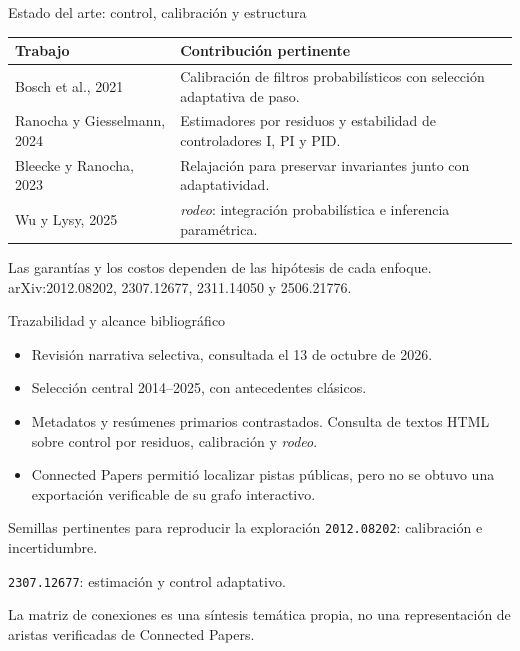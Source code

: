\documentclass[aspectratio=169,11pt]{beamer}
\newcommand{\source}[1]{\vfill{\tiny\color{graytext}#1}}
\begin{document}
\begin{frame}{Estado del arte: control, calibración y estructura}
\small\renewcommand{\arraystretch}{1.35}
\begin{tabularx}{0.98\linewidth}{@{}p{3.7cm}X@{}}\toprule
Trabajo & Contribución pertinente\\\midrule
Bosch et al., 2021 & Calibración de filtros probabilísticos con selección adaptativa de paso.\\
Ranocha y Giesselmann, 2024 & Estimadores por residuos y estabilidad de controladores I, PI y PID.\\
Bleecke y Ranocha, 2023 & Relajación para preservar invariantes junto con adaptatividad.\\
Wu y Lysy, 2025 & \emph{rodeo}: integración probabilística e inferencia paramétrica.\\\bottomrule
\end{tabularx}\par
\vspace{0.3cm}
\small Las garantías y los costos dependen de las hipótesis de cada enfoque.
\source{arXiv:2012.08202, 2307.12677, 2311.14050 y 2506.21776.}
\end{frame}

\begin{frame}{Trazabilidad y alcance bibliográfico}
\begin{itemize}
\item Revisión narrativa selectiva, consultada el 13 de octubre de 2026.
\item Selección central 2014--2025, con antecedentes clásicos.
\item Metadatos y resúmenes primarios contrastados. Consulta de textos HTML sobre control por residuos, calibración y \emph{rodeo}.
\item Connected Papers permitió localizar pistas públicas, pero no se obtuvo una exportación verificable de su grafo interactivo.
\end{itemize}
\begin{block}{Semillas pertinentes para reproducir la exploración}
\texttt{2012.08202}: calibración e incertidumbre.\par
\texttt{2307.12677}: estimación y control adaptativo.
\end{block}
\small La matriz de conexiones es una síntesis temática propia, no una
representación de aristas verificadas de Connected Papers.
\end{frame}
\end{document}
